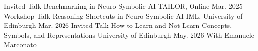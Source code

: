 \documentclass[11pt, a4paper]{awesome-cv}
\makeatletter
\newcommand*{\refsectionbibcount}{\arabic{datacount@\the\c@refsection}}
\makeatother
\begin{document}


\begin{cventries}
  \cventry
    {Invited Talk}
    {Benchmarking in Neuro-Symbolic AI}
    {TAILOR, Online}
    {Mar. 2025}
    {}
  \cventry
    {Workshop Talk}
    {Reasoning Shortcuts in Neuro-Symbolic AI}
    {IML, University of Edinburgh}
    {Mar. 2026}
    {}
  \cventry
    {Invited Talk}
    {How to Learn and Not Learn Concepts, Symbols, and Representations}
    {University of Edinburgh}
    {May. 2026}
    {With Emanuele Marconato}
\end{cventries}
\end{document}
